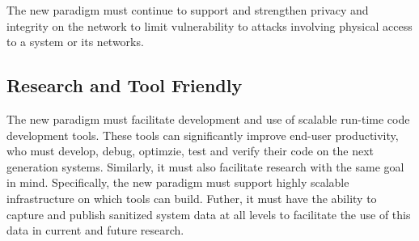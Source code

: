 \documentclass{article}
\newcommand{\ngrm}{NGRM}
\begin{document}
The new paradigm must continue to support and strengthen privacy 
and integrity on
the network to limit vulnerability to attacks involving physical access
to a system or its networks.

%

\subsection{Research and Tool Friendly}

The new paradigm must facilitate development and use of 
scalable run-time code development tools. These tools can significantly 
improve end-user productivity, who must develop, debug, optimzie, 
test and verify their code on the next generation systems. 
Similarly, it must
also facilitate research with the same goal in mind.
Specifically, the new paradigm must support highly scalable infrastructure
on which tools can build. Futher, it must have 
the ability to capture and
publish sanitized system data at all levels to facilitate the use of
this data in current and future research. 

%
\end{document}
